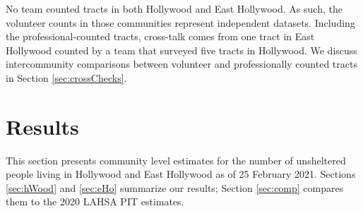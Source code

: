 \documentclass[11pt,twocolumn]{article}
\def\bfr{\bf\color{red}}
\begin{document}


No team counted tracts in both Hollywood and East Hollywood. As such, the volunteer counts
in those communities represent independent datasets. Including the professional-counted tracts, 
cross-talk comes from one tract in East Hollywood counted by a team that surveyed five 
tracts in Hollywood. We discuss intercommunity comparisons between volunteer and 
professionally counted tracts in Section \ref{sec:crossChecks}.

%
%


\section{Results}
\label{sec:results}

This section presents community level estimates for the number of unsheltered people living in
Hollywood and East Hollywood as of 25 February 2021. Sections \ref{sec:hWood} and \ref{sec:eHo} 
summarize our results; Section \ref{sec:comp} compares them to the 2020 LAHSA PIT estimates.
\end{document}
